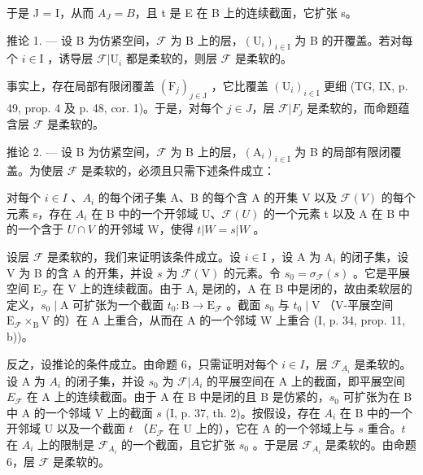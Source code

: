 于是 J = I，从而 \(A_{J} = B\)，且 t 是 E 在 B 上的连续截面，它扩张 s。

推论 1. --- 设 B 为仿紧空间，\(\mathcal{F}\) 为 B 上的层，\((\mathrm{U}_i)_{i\in \mathrm{I}}\) 为 B 的开覆盖。若对每个 \(i\in \mathrm{I}\) ，诱导层 \(\mathcal{F}|\mathrm{U}_i\) 都是柔软的，则层 \(\mathcal{F}\) 是柔软的。

事实上，存在局部有限闭覆盖 \((\mathrm{F}_{j})_{j\in\mathrm{J}}\) ，它比覆盖 \((\mathrm{U}_{i})_{i\in\mathrm{I}}\) 更细 (TG, IX, p. 49, prop. 4 及 p. 48, cor. 1)。于是，对每个 \(j\in J\)，层 \(\mathcal{F}|F_{j}\) 是柔软的，而命题蕴含层 \(\mathcal{F}\) 是柔软的。

推论 2. --- 设 B 为仿紧空间，\(\mathcal{F}\) 为 B 上的层，\((\mathrm{A}_i)_{i\in \mathrm{I}}\) 为 B 的局部有限闭覆盖。为使层 \(\mathcal{F}\) 是柔软的，必须且只需下述条件成立：

对每个 \(i \in I\) 、\(A_{i}\) 的每个闭子集 A、B 的每个含 A 的开集 V 以及 \(\mathcal{F}(V)\) 的每个元素 s，存在 \(A_{i}\) 在 B 中的一个开邻域 U、\(\mathcal{F}(U)\) 的一个元素 t 以及 A 在 B 中的一个含于 \(U \cap V\) 的开邻域 W，使得 \(t | W = s | W\) 。

设层 \(\mathcal{F}\) 是柔软的，我们来证明该条件成立。设 \(i\in\mathrm{I}\) ，设 A 为 \(\mathrm{A}_{i}\) 的闭子集，设 V 为 B 的含 A 的开集，并设 \(s\) 为 \(\mathcal{F}(\mathrm{V})\) 的元素。令 \(s_{0}=\sigma_{\mathcal{F}}(s)\) 。它是平展空间 \(\mathrm{E}_{\mathcal{F}}\) 在 V 上的连续截面。由于 \(\mathrm{A}_{i}\) 是闭的，A 在 B 中是闭的，故由柔软层的定义，\(s_{0}\mid\mathrm{A}\) 可扩张为一个截面 \(t_{0}\colon\mathrm{B}\to\mathrm{E}_{\mathcal{F}}\) 。截面 \(s_{0}\) 与 \(t_{0}\mid\mathrm{V}\) （V-平展空间 \(\mathrm{E}_{\mathcal{F}}\times_{\mathrm{B}}\mathrm{V}\) 的）在 A 上重合，从而在 A 的一个邻域 W 上重合 (I, p. 34, prop. 11, b))。

反之，设推论的条件成立。由命题 6，只需证明对每个 \(i \in I\)，层 \(\mathcal{F}_{A_i}\) 是柔软的。设 A 为 \(A_i\) 的闭子集，并设 \(s_0\) 为 \(\mathcal{F} | A_i\) 的平展空间在 A 上的截面，即平展空间 \(E_{\mathcal{F}}\) 在 A 上的连续截面。由于 A 在 B 中是闭的且 B 是仿紧的，\(s_0\) 可扩张为在 B 中 A 的一个邻域 V 上的截面 \(s\) (I, p. 37, th. 2)。按假设，存在 \(A_i\) 在 B 中的一个开邻域 U 以及一个截面 \(t\) （\(E_{\mathcal{F}}\) 在 U 上的），它在 A 的一个邻域上与 \(s\) 重合。\(t\) 在 \(A_i\) 上的限制是 \(\mathcal{F}_{A_i}\) 的一个截面，且它扩张 \(s_0\) 。于是层 \(\mathcal{F}_{A_i}\) 是柔软的。由命题 6，层 \(\mathcal{F}\) 是柔软的。


